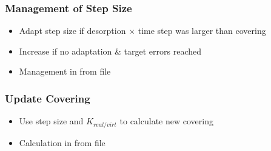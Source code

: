\subsubsection{Management of Step Size}
\begin{itemize}[noitemsep,topsep=0pt, partopsep=0pt]
\item Adapt step size if desorption $\times$ time step was larger than covering 
\item Increase  if no adaptation \& target errors reached
\item Management in  from  file
\end{itemize}

\subsubsection{Update Covering}
\begin{itemize}[noitemsep,topsep=0pt, partopsep=0pt]
\item Use step size and $K_{real/virt}$ to calculate new covering
\item Calculation in  from  file
\end{itemize}


